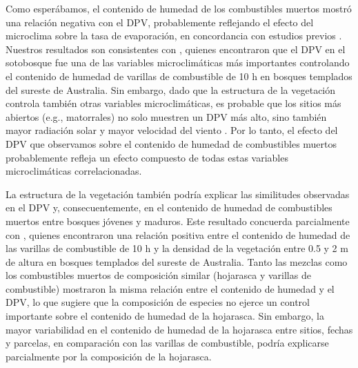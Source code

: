 Como esperábamos, el contenido de humedad de los combustibles muertos mostró una relación negativa con el DPV, probablemente reflejando el efecto del microclima sobre la tasa de evaporación, en concordancia con estudios previos \citep{uhl_fire_1988, hoffmann_fuels_2012, little_fire_2012, balch_susceptibility_2015, kane_stand_2021}. Nuestros resultados son consistentes con \citet{brown_sensitivity_2022}, quienes encontraron que el DPV en el sotobosque fue una de las variables microclimáticas más importantes controlando el contenido de humedad de varillas de combustible de 10 h en bosques templados del sureste de Australia. Sin embargo, dado que la estructura de la vegetación controla también otras variables microclimáticas, es probable que los sitios más abiertos (e.g., matorrales) no solo muestren un DPV más alto, sino también mayor radiación solar y mayor velocidad del viento \citep{little_fire_2012, jucker_canopy_2018, de_frenne_global_2019, wolf_wildfire_2021}. Por lo tanto, el efecto del DPV que observamos sobre el contenido de humedad de combustibles muertos probablemente refleja un efecto compuesto de todas estas variables microclimáticas correlacionadas.

La estructura de la vegetación también podría explicar las similitudes observadas en el DPV y, consecuentemente, en el contenido de humedad de combustibles muertos entre bosques jóvenes y maduros. Este resultado concuerda parcialmente con \citet{brown_forest_2021}, quienes encontraron una relación positiva entre el contenido de humedad de las varillas de combustible de 10 h y la densidad de la vegetación entre 0.5 y 2 m de altura en bosques templados del sureste de Australia. Tanto las mezclas como los combustibles muertos de composición similar (hojarasca y varillas de combustible) mostraron la misma relación entre el contenido de humedad y el DPV, lo que sugiere que la composición de especies no ejerce un control importante sobre el contenido de humedad de la hojarasca. Sin embargo, la mayor variabilidad en el contenido de humedad de la hojarasca entre sitios, fechas y parcelas, en comparación con las varillas de combustible, podría explicarse parcialmente por la composición de la hojarasca.


